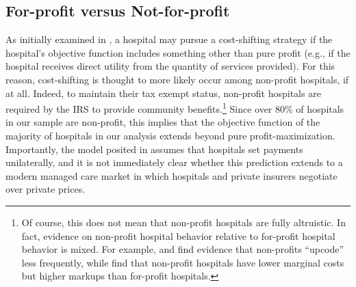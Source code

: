 \documentclass[12pt]{article}
\begin{document}
\subsection{For-profit versus Not-for-profit}
As initially examined in \cite{dranove1988}, a hospital may pursue a cost-shifting strategy if the hospital's objective function includes something other than pure profit (e.g., if the hospital receives direct utility from the quantity of services provided). For this reason, cost-shifting is thought to more likely occur among non-profit hospitals, if at all. Indeed, to maintain their tax exempt status, non-profit hospitals are required by the IRS to provide community benefits.\footnote{Of course, this does not mean that non-profit hospitals are fully altruistic. In fact, evidence on non-profit hospital behavior relative to for-profit hospital behavior is mixed. For example, \cite{silverman2004} and \cite{dafny2005} find evidence that non-profits ``upcode'' less frequently, while \cite{gaynor2003} find that non-profit hospitals have lower marginal costs but higher markups than for-profit hospitals.} Since over 80$\%$ of hospitals in our sample are non-profit, this implies that the objective function of the majority of hospitals in our analysis extends beyond pure profit-maximization.  Importantly, the model posited in \cite{dranove1988} assumes that hospitals set payments unilaterally, and it is not immediately clear whether this prediction extends to a modern managed care market in which hospitals and private insurers negotiate over private prices.
\end{document}
